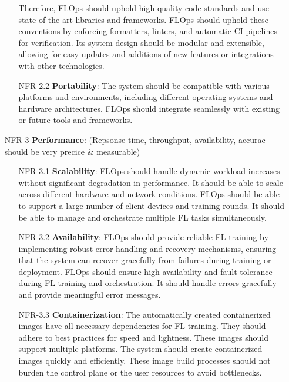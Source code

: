 \begin{itemize}
\begin{itemize}
            Therefore, FLOps should uphold high-quality code standards and use state-of-the-art libraries and frameworks.
            FLOps should uphold these conventions by enforcing formatters, linters, and automatic CI pipelines for verification.
            Its system design should be modular and extensible, allowing for easy updates and additions of new features or integrations with other technologies.
        \item [NFR-2.2] {\textbf{Portability}}:
            The system should be compatible with various platforms and environments, including different operating systems and hardware architectures.
            FLOps should integrate seamlessly with existing or future tools and frameworks.
        \end{itemize}
    \item [NFR-3] {\textbf{Performance}}: (Repsonse time, throughput, availability, accurac - should be very precice \& measurable)
        \begin{itemize}
        \item [NFR-3.1] {\textbf{Scalability}}:
            FLOps should handle dynamic workload increases without significant degradation in performance.
            It should be able to scale across different hardware and network conditions.
            FLOps should be able to support a large number of client devices and training rounds.
            It should be able to manage and orchestrate multiple FL tasks simultaneously.
        \item [NFR-3.2] {\textbf{Availability}}:
            FLOps should provide reliable FL training by implementing robust error handling and recovery mechanisms, ensuring that the system can recover gracefully from failures during training or deployment.
            FLOps should ensure high availability and fault tolerance during FL training and orchestration.
            It should handle errors gracefully and provide meaningful error messages.
        \item [NFR-3.3] {\textbf{Containerization}}:
            The automatically created containerized images have all necessary dependencies for FL training.
            They should adhere to best practices for speed and lightness.
            These images should support multiple platforms.
            The system should create containerized images quickly and efficiently.
            These image build processes should not burden the control plane or the user resources to avoid bottlenecks.
        \end{itemize}

\end{itemize}
